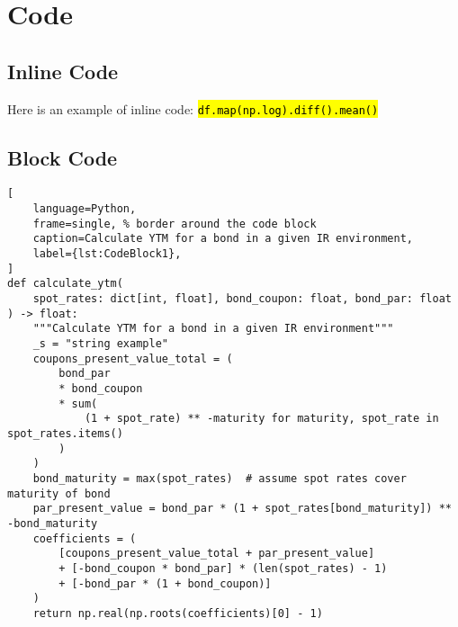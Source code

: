 \documentclass[titlepage]{article}
\newcommand{\code}[1]{\texttt{\textcolor{RedViolet}{\hl{\;#1\;}}}}
\begin{document}
\section{Code}

\subsection{Inline Code}

Here is an example of inline code:
\code{df.map(np.log).diff().mean()}

\subsection{Block Code}

\begin{minipage}{\linewidth}
\begin{lstlisting}[
    language=Python,
    frame=single, % border around the code block
    caption=Calculate YTM for a bond in a given IR environment,
    label={lst:CodeBlock1},
]
def calculate_ytm(
    spot_rates: dict[int, float], bond_coupon: float, bond_par: float
) -> float:
    """Calculate YTM for a bond in a given IR environment"""
    _s = "string example"
    coupons_present_value_total = (
        bond_par
        * bond_coupon
        * sum(
            (1 + spot_rate) ** -maturity for maturity, spot_rate in spot_rates.items()
        )
    )
    bond_maturity = max(spot_rates)  # assume spot rates cover maturity of bond
    par_present_value = bond_par * (1 + spot_rates[bond_maturity]) ** -bond_maturity
    coefficients = (
        [coupons_present_value_total + par_present_value]
        + [-bond_coupon * bond_par] * (len(spot_rates) - 1)
        + [-bond_par * (1 + bond_coupon)]
    )
    return np.real(np.roots(coefficients)[0] - 1)
\end{lstlisting}
\end{minipage}
\end{document}
